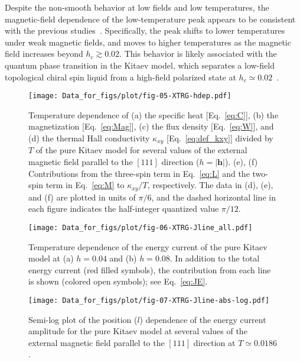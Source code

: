 \documentclass[twocolumn,superscriptaddress,showpacs, longbibliography, aps, prx]{revtex4-2}
\begin{document}
Despite the non-smooth behavior at low fields and low temperatures, the magnetic-field dependence of the low-temperature peak appears to be consistent with the previous studies~\cite{YoshitakeNKM2020,Li2020,LiZWWGQLGL2021,LiLXGQLS2024}. 
Specifically, the peak shifts to lower temperatures under weak magnetic fields, and moves to higher temperatures as the magnetic field increases beyond $h_c \gtrsim 0.02$.
This behavior is likely associated with the quantum phase transition in the Kitaev model, which separates a low-field topological chiral spin liquid from a high-field polarized state at $h_c \simeq 0.02$~\cite{Jiang2011}. 

\begin{figure}
  \begin{center}
    \texttt{[image: Data\_for\_figs/plot/fig-05-XTRG-hdep.pdf]}
  \end{center}
  \caption{Temperature dependence of (a) the specific heat [Eq.~\eqref{eq:C}], (b) the magnetization [Eq.~\eqref{eq:Mag}], (c) the flux density [Eq.~\eqref{eq:W}], and (d) the thermal Hall conductivity $\kappa_{xy}$ [Eq.~\eqref{eq:def_kxy}] divided by $T$ of the pure Kitaev model for several values of the external magnetic field parallel to the $[111]$ direction ($h=|\bm{h}|$). (e), (f) Contributions from the three-spin term in Eq.~\eqref{eq:L} and the two-spin term in Eq.~\eqref{eq:M} to $\kappa_{xy}/T$, respectively. The data in (d), (e), and (f) are plotted in units of $\pi/6$, and the dashed horizontal line in each figure indicates the half-integer quantized value $\pi/12$.
  }
  \label{fig:CMF_pure}
\end{figure}

\begin{figure}[htb]
  \begin{center}
    \texttt{[image: Data\_for\_figs/plot/fig-06-XTRG-Jline\_all.pdf]}
  \end{center}
  \caption{Temperature dependence of the energy current of the pure Kitaev model at (a) $h=0.04$ and (b) $h=0.08$. In addition to the total energy current (red filled symbols), the contribution from each line is shown (colored open symbols); see Eq.~\eqref{eq:JE}.
}
  \label{fig:J_line}
\end{figure}

\begin{figure}[htb]
  \begin{center}
    \texttt{[image: Data\_for\_figs/plot/fig-07-XTRG-Jline-abs-log.pdf]}
  \end{center}
  \caption{Semi-log plot of the position ($l$) dependence of the energy current amplitude for the pure Kitaev model at several values of the external magnetic field parallel to the $[111]$ direction at $T \simeq 0.0186$.} 
  \label{fig:J_line_dep}
\end{figure}
\end{document}

